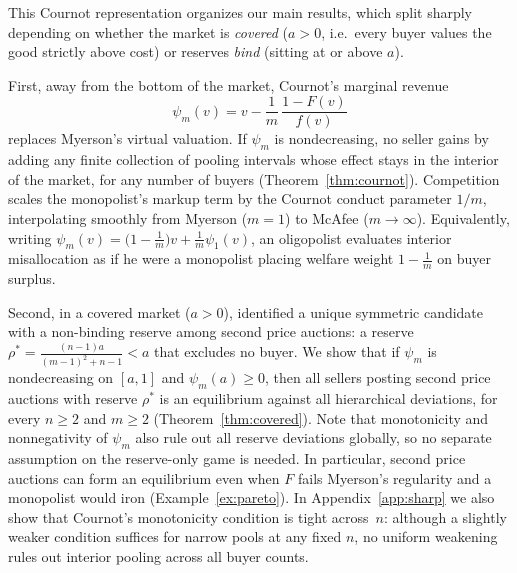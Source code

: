 \documentclass[12pt]{article}
\newcommand{\citeasnoun}[1]{\citet{#1}}
\theoremstyle{mystyle}
\theoremstyle{mystyle2}
\newcommand{\1}{\mathbf{1}}
\begin{document}
This Cournot representation organizes our main results, which split sharply depending on whether the market is \emph{covered} ($a>0$, i.e.\ every buyer values the good strictly above cost) or reserves \emph{bind} (sitting at or above $a$).

First, away from the bottom of the market, Cournot's marginal revenue
\[
\psi_m(v) = v - \frac{1}{m}\,\frac{1-F(v)}{f(v)}
\]
replaces Myerson's virtual valuation. If $\psi_m$ is nondecreasing, no seller gains by adding any finite collection of pooling intervals whose effect stays in the interior of the market, for any number of buyers (Theorem~\ref{thm:cournot}). Competition scales the monopolist's markup term by the Cournot conduct parameter $1/m$, interpolating smoothly from Myerson ($m=1$) to McAfee ($m\to\infty$). Equivalently, writing $\psi_m(v)=\bigl(1-\frac{1}{m}\bigr)v+\frac{1}{m}\psi_1(v)$, an oligopolist evaluates interior misallocation as if he were a monopolist placing welfare weight $1-\frac{1}{m}$ on buyer surplus.

Second, in a covered market ($a>0$), \citeasnoun{virag2010competing} identified a unique symmetric candidate with a non-binding reserve among second price auctions: a reserve $\rho^*=\frac{(n-1)a}{(m-1)^2+n-1}<a$ that excludes no buyer. We show that if $\psi_m$ is nondecreasing on $[a,1]$ and $\psi_m(a)\ge 0$, then all sellers posting second price auctions with reserve $\rho^*$ is an equilibrium against all hierarchical deviations, for every $n\ge 2$ and $m\ge 2$ (Theorem~\ref{thm:covered}). Note that monotonicity and nonnegativity of $\psi_m$ also rule out all reserve deviations globally, so no separate assumption on the reserve-only game is needed. In particular, second price auctions can form an equilibrium even when $F$ fails Myerson's regularity and a monopolist would iron (Example~\ref{ex:pareto}). In Appendix~\ref{app:sharp} we also show that Cournot's monotonicity condition is tight across~$n$: although a slightly weaker condition suffices for narrow pools at any fixed $n$, no uniform weakening rules out interior pooling across all buyer counts.
\end{document}
